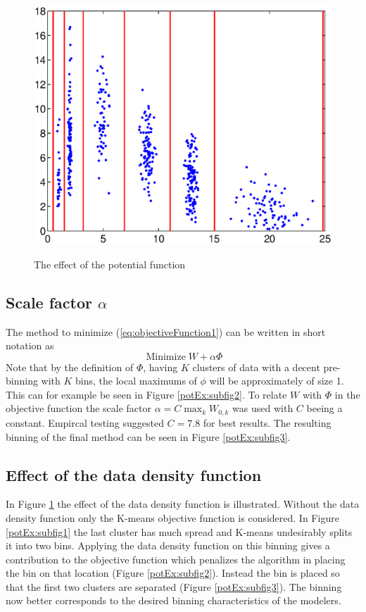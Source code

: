 \begin{figure}[!ht]
{\includegraphics[scale=0.35, trim = 18mm 9mm 15mm 0, clip ]{inputs/2c.eps}
\label{potEx:subfig3}
}
\caption[]{The effect of the potential function}
\label{potEx}
\end{figure}

\subsection{Scale factor $\alpha$}
The method to minimize (\ref{eq:objectiveFunction1}) can be written in short notation as
\begin{equation}
	\operatorname{Minimize} W + \alpha\Phi
	\label{eq:Method1}
\end{equation}
Note that by the definition of $\Phi$, having $K$ clusters of data with a decent pre-binning with $K$ bins, the local maximums of $\phi$ will be approximately of size 1. This can for example be seen in Figure \ref{potEx:subfig2}. To relate $W$ with $\Phi$ in the objective function the scale factor $\alpha=C\max_k{W_{0,k}}$ was used with $C$ beeing a constant. Empircal testing suggested $C=7.8$ for best results. The resulting binning of the final method can be seen in Figure \ref{potEx:subfig3}.


\subsection{Effect of the data density function}
In Figure \ref{potEx} the effect of the data density function is illustrated. Without the data density function only the K-means objective function is considered. In Figure \ref{potEx:subfig1} the last cluster has much spread and K-means undesirably splits it into two bins. Applying the data density function on this binning gives a contribution to the objective function which penalizes the algorithm in placing the bin on that location (Figure \ref{potEx:subfig2}). Instead the bin is placed so that the first two clusters are separated (Figure \ref{potEx:subfig3}). The binning now  better corresponds to the desired binning characteristics of the modelers.
\



